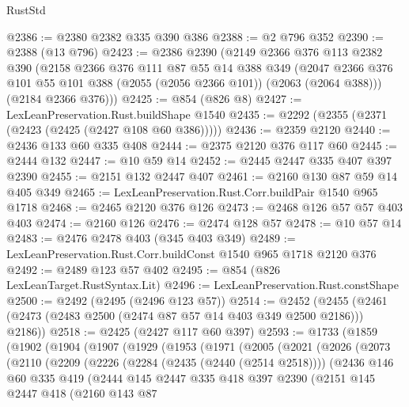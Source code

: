 \begin{lexlean}{RustStd}
\begin{coremodule}
@2386 := @2380 @2382 @335 @390 @386
@2388 := @2 @796 @352
@2390 := @2388 (@13 @796)
@2423 := @2386
    @2390
    (@2149
      @2366
      @376
      @113
      @2382
      @390
      (@2158
        @2366
        @376
        @111
        @87
        @55
        @14
        @388
        @349
        (@2047 @2366 @376 @101 @55 @101 @388 (@2055 (@2056 @2366 @101)) (@2063 (@2064 @388)))
        (@2184 @2366 @376)))
@2425 := @854 (@826 @8)
@2427 := LexLeanPreservation.Rust.buildShape @1540
@2435 := @2292 (@2355 (@2371 (@2423 (@2425 (@2427 @108 @60 @386)))))
@2436 := @2359 @2120
@2440 := @2436 @133 @60 @335 @408
@2444 := @2375 @2120 @376 @117 @60
@2445 := @2444 @132
@2447 := @10 @59 @14
@2452 := @2445 @2447 @335 @407 @397 @2390
@2455 := @2151 @132 @2447 @407
@2461 := @2160 @130 @87 @59 @14 @405 @349
@2465 := LexLeanPreservation.Rust.Corr.buildPair @1540 @965 @1718
@2468 := @2465 @2120 @376 @126
@2473 := @2468 @126 @57 @57 @403 @403
@2474 := @2160 @126
@2476 := @2474 @128 @57
@2478 := @10 @57 @14
@2483 := @2476 @2478 @403 (@345 @403 @349)
@2489 := LexLeanPreservation.Rust.Corr.buildConst @1540 @965 @1718 @2120 @376
@2492 := @2489 @123 @57 @402
@2495 := @854 (@826 LexLeanTarget.RustSyntax.Lit)
@2496 := LexLeanPreservation.Rust.constShape
@2500 := @2492 (@2495 (@2496 @123 @57))
@2514 := @2452 (@2455 (@2461 (@2473 (@2483 @2500 (@2474 @87 @57 @14 @403 @349 @2500 @2186))) @2186))
@2518 := @2425 (@2427 @117 @60 @397)
@2593 := @1733
    (@1859
      (@1902
        (@1904
          (@1907
            (@1929
              (@1953
                (@1971
                  (@2005
                    (@2021
                      (@2026
                        (@2073
                          (@2110
                            (@2209
                              (@2226
                                (@2284 (@2435 (@2440 (@2514 @2518))))
                                (@2436
                                  @146
                                  @60
                                  @335
                                  @419
                                  (@2444
                                    @145
                                    @2447
                                    @335
                                    @418
                                    @397
                                    @2390
                                    (@2151
                                      @145
                                      @2447
                                      @418
                                      (@2160
                                        @143
                                        @87

\end{coremodule}
\end{lexlean}
